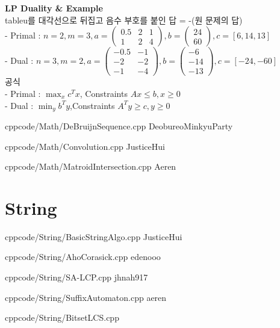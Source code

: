 \documentclass[landscape, 8pt, a4paper, oneside]{extarticle} %
\begin{document}
\begin{multicols*}{3}
\noindent
\textbf{LP Duality \& Example}\\
tableu를 대각선으로 뒤집고 음수 부호를 붙인 답 = -(원 문제의 답)\\
- Primal : $n = 2, m = 3, a = \begin{pmatrix} 0.5 & 2 & 1 \\ 1 & 2 & 4 \end{pmatrix}, b = \begin{pmatrix} 24 \\ 60 \end{pmatrix}, c = [6, 14, 13]$\\
- Dual : $n = 3, m = 2, a = \begin{pmatrix} -0.5 & -1 \\ -2 & -2 \\ -1 & -4 \end{pmatrix}, b = \begin{pmatrix} -6 \\ -14 \\ -13 \end{pmatrix}, c = [-24, -60]$\\
공식\\
- Primal : $\max_{x} c^Tx$, Constraints $Ax \leq b, x \geq 0$\\
- Dual : $\min_{y} b^Ty$,Constraints $A^Ty \geq c, y \geq 0$ 

{}{}
{cpp}{code/Math/DeBruijnSequence.cpp}
{DeobureoMinkyuParty}

{}{}
{cpp}{code/Math/Convolution.cpp}
{JusticeHui}

{}{}
{cpp}{code/Math/MatroidIntersection.cpp}
{Aeren}

\section{String}

{}{}
{cpp}{code/String/BasicStringAlgo.cpp}
{JusticeHui}

{}{}
{cpp}{code/String/AhoCorasick.cpp}
{edenooo}

{}{}
{cpp}{code/String/SA-LCP.cpp}
{jhnah917}

{}{}
{cpp}{code/String/SuffixAutomaton.cpp}
{aeren} %

{}{}
{cpp}{code/String/BitsetLCS.cpp}


\end{multicols*}
\end{document}
